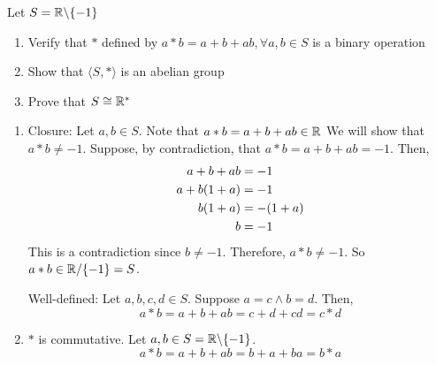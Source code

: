 \begin{exercise}
    Let $S = \mathbb{R} \backslash \qty{-1}$
    \begin{enumerate}
        \item Verify that $\ast$ defined by $a \ast b = a + b + ab, \forall a, b \in S$ is a binary operation
        \item Show that $\langle S, \ast \rangle$ is an abelian group
        \item Prove that $S \cong \mathbb{R}^*$
    \end{enumerate}
\end{exercise}

\begin{solution} \phantom{blank}
    \begin{enumerate}
        \item Closure: Let $a, b \in S$. Note that $a \ast b = a + b + ab \in \mathbb{R}$ We will show that $a \ast b \neq - 1$. Suppose, by contradiction, that $a \ast b = a + b + ab = -1$. Then,
        \begin{align*}
            a + b + ab &= -1 \\
            a + b\qty(1 + a) &= -1 \\
            b \qty(1 + a) &= - \qty(1 + a) \\
            b &= -1
        \end{align*}
        This is a contradiction since $b \neq -1$. Therefore, $a \ast b \neq -1$. So $a \ast b \in \mathbb{R}/ \qty{-1} = S$. 
        
        Well-defined: Let $a, b, c, d \in S$. Suppose $a = c \land b = d$. Then, 
        \[ a \ast b = a + b + ab = c + d + cd = c \ast d\]
        \item $\ast$ is commutative. Let $a, b \in S = \mathbb{R} \backslash \qty{-1}$.
        \[ a \ast b = a + b + ab = b + a + ba = b \ast a \] 
        

\end{enumerate}
\end{solution}
